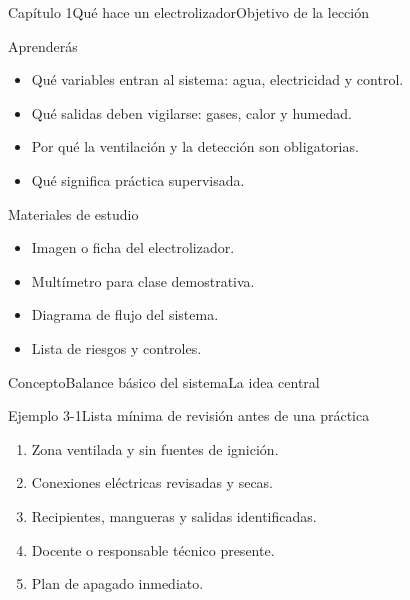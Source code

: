 \documentclass{../plantilla/hvtbook}
\begin{document}
\HVTMakeTitle
\begin{HVTPage}{Capítulo 1}{Qué hace un electrolizador}{Objetivo de la lección}
\begin{HVTGrid}
\begin{HVTColumn}{Aprenderás}\begin{itemize}\item Qué variables entran al sistema: agua, electricidad y control. \item Qué salidas deben vigilarse: gases, calor y humedad. \item Por qué la ventilación y la detección son obligatorias. \item Qué significa práctica supervisada.\end{itemize}\end{HVTColumn}
\begin{HVTColumn}{Materiales de estudio}\begin{itemize}\item Imagen o ficha del electrolizador. \item Multímetro para clase demostrativa. \item Diagrama de flujo del sistema. \item Lista de riesgos y controles.\end{itemize}\end{HVTColumn}
\end{HVTGrid}
\end{HVTPage}
\begin{HVTPage}{Concepto}{Balance básico del sistema}{La idea central}
\begin{HVTFlow}\end{HVTFlow}
\begin{HVTExample}{Ejemplo 3-1}{Lista mínima de revisión antes de una práctica}\begin{enumerate}\item Zona ventilada y sin fuentes de ignición. \item Conexiones eléctricas revisadas y secas. \item Recipientes, mangueras y salidas identificadas. \item Docente o responsable técnico presente. \item Plan de apagado inmediato.\end{enumerate}\end{HVTExample}
\end{HVTPage}
\end{document}
